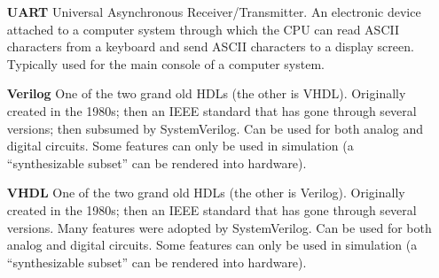 \begin{itemize}
\item[\bf UART] Universal Asynchronous Receiver/Transmitter.  An
  electronic device attached to a computer system through which the
  CPU can read ASCII characters from a keyboard and send ASCII
  characters to a display screen.  Typically used for the main console
  of a computer system.

\item[\bf Verilog] One of the two grand old HDLs (the other is VHDL).
  Originally created in the 1980s; then an IEEE standard that has gone
  through several versions; then subsumed by SystemVerilog.  Can be
  used for both analog and digital circuits.  Some features can only
  be used in simulation (a ``synthesizable subset'' can be rendered
  into hardware).

\item[\bf VHDL] One of the two grand old HDLs (the other is Verilog).
  Originally created in the 1980s; then an IEEE standard that has gone
  through several versions. Many features were adopted by
  SystemVerilog.  Can be used for both analog and digital circuits.
  Some features can only be used in simulation (a ``synthesizable
  subset'' can be rendered into hardware).

\end{itemize}

